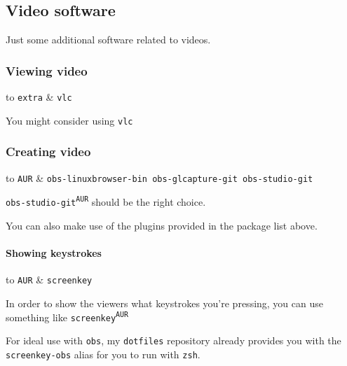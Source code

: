 \documentclass[9pt]{report}
\newenvironment{NOTE}
{\begin{tcolorbox}[colback=admonitionBG,coltitle=draculaFG,colframe=draculaBlue,colbacktitle=draculaBlue,title=NOTE]}
{\end{tcolorbox}}
\newenvironment{packagetable}
{\begin{longtabu}to \textwidth [b]{X[1,r]|X[1,l]}}
{\end{longtabu}}
\begin{document}
\newpage

\hypertarget{x-video-software}{\subsection{Video software}}
Just some additional software related to videos.



\newpage

\hypertarget{x-viewing-video}{\subsubsection{Viewing video}}
\begin{packagetable}
    \texttt{extra} & \texttt{vlc} \\ 
\end{packagetable}

You might consider using \texttt{vlc}



\newpage

\hypertarget{x-creating-video}{\subsubsection{Creating video}}
\begin{packagetable}
    \texttt{AUR} & \texttt{obs-linuxbrowser-bin obs-glcapture-git obs-studio-git} \\ 
\end{packagetable}

\texttt{obs-studio-git\textsuperscript{\texttt{AUR}}} should be the right choice.


You can also make use of the plugins provided in the package list above.



\newpage

\hypertarget{x-showing-keystrokes}{\paragraph{Showing keystrokes}}
\begin{packagetable}
    \texttt{AUR} & \texttt{screenkey} \\ 
\end{packagetable}

In order to show the viewers what keystrokes you’re pressing, you can use something like \texttt{screenkey\textsuperscript{\texttt{AUR}}}


\begin{NOTE}
    For ideal use with \texttt{obs}, my \texttt{dotfiles} repository already provides you with the \texttt{screenkey-obs} alias for you to run with \texttt{zsh}.

\end{NOTE}
\end{document}
